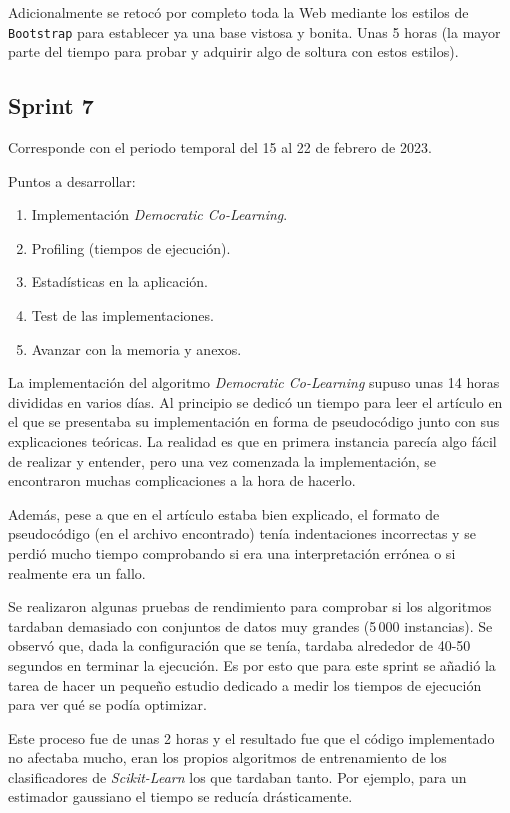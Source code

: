 Adicionalmente se retocó por completo toda la Web mediante los estilos de
\texttt{Bootstrap} para establecer ya una base vistosa y bonita. Unas 5 horas
(la mayor parte del tiempo para probar y adquirir algo de soltura con estos
estilos).

\subsection{Sprint 7}
Corresponde con el periodo temporal del 15 al 22 de febrero de 2023.

Puntos a desarrollar:
\begin{enumerate}
    \item Implementación \textit{Democratic Co-Learning}.
    \item Profiling (tiempos de ejecución).
    \item Estadísticas en la aplicación.
    \item Test de las implementaciones.
    \item Avanzar con la memoria y anexos.
\end{enumerate}

La implementación del algoritmo \textit{Democratic Co-Learning} supuso unas 14
horas divididas en varios días. Al principio se dedicó un tiempo para leer el
artículo en el que se presentaba su implementación en forma de pseudocódigo
junto con sus explicaciones teóricas. La realidad es que en primera instancia
parecía algo fácil de realizar y entender, pero una vez comenzada la
implementación, se encontraron muchas complicaciones a la hora de hacerlo. 

Además, pese a que en el artículo estaba bien explicado, el formato de
pseudocódigo (en el archivo encontrado) tenía indentaciones incorrectas y se
perdió mucho tiempo comprobando si era una interpretación errónea o si realmente
era un fallo.

Se realizaron algunas pruebas de rendimiento para comprobar si los algoritmos
tardaban demasiado con conjuntos de datos muy grandes (5\,000 instancias). Se
observó que, dada la configuración que se tenía, tardaba alrededor de 40-50
segundos en terminar la ejecución. Es por esto que para este sprint se añadió la
tarea de hacer un pequeño estudio dedicado a medir los tiempos de ejecución para
ver qué se podía optimizar. 

Este proceso fue de unas 2 horas y el resultado fue que el código implementado
no afectaba mucho, eran los propios algoritmos de entrenamiento de los
clasificadores de \textit{Scikit-Learn} los que tardaban tanto. Por ejemplo,
para un estimador gaussiano el tiempo se reducía drásticamente.

